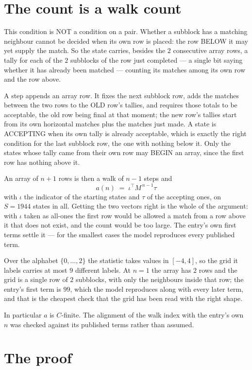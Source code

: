 \documentclass[11pt,a4paper]{article}
\theoremstyle{plain}
\theoremstyle{definition}
\begin{document}
\section{The count is a walk count}

This condition is NOT a condition on a pair. Whether a subblock has a
matching neighbour cannot be decided when its own row is placed: the row BELOW it may yet
supply the match. So the state carries, besides the $2$ consecutive array rows, a tally for
each of the $2$ subblocks of the row just completed --- a single bit saying whether it has already been matched --- counting its matches
among its own row and the row above.

A step appends an array row. It fixes the next subblock row, adds the matches between the two
rows to the OLD row's tallies, and requires those totals to be acceptable, the old row being
final at that moment; the new row's tallies start from its own horizontal matches plus the
matches just made. A state is ACCEPTING when its own tally is already acceptable, which is
exactly the right condition for the last subblock row, the one with nothing below it. Only the
states whose tally came from their own row may BEGIN an array, since the first row has nothing
above it.

An array of $n+1$ rows is then a walk of $n-1$ steps and
\[
a(n)\;=\;\iota^{\!\top}M^{\,n-1}\tau
\]
with $\iota$ the indicator of the starting states and $\tau$ of the accepting ones, on
$S=1944$ states in all. Getting the two vectors right is the whole of the argument: with
$\iota$ taken as all-ones the first row would be allowed a match from a row above it that does
not exist, and the count would be too large. The entry's own first terms settle it --- for
the smallest cases
the model reproduces every published term.

Over the alphabet $\{0,\dots,2\}$ the statistic takes values in $[-4,4]$, so the
grid it labels carries at most $9$ different labels. At $n=1$ the array has $2$
rows and the grid is a single row of $2$
subblocks, with only the neighbours inside that row; the entry's first term is
$99$, which the model reproduces along with every later term, and that is the cheapest
check that the grid has been read with the right shape.

In particular $a$ is $C$-finite. The alignment of the walk index with the entry's own $n$ was
checked against its published terms rather than assumed.

\section{The proof}
\end{document}
